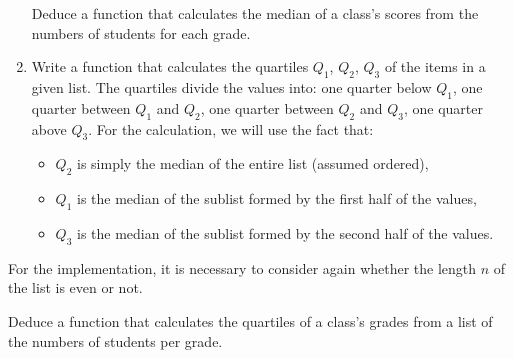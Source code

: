 \documentclass[11pt,class=report,crop=false]{standalone}
\begin{document}
\begin{activite}
\begin{enumerate}

       
    Deduce a function that calculates the median of a class's scores from the numbers of students for each grade.
    
    \item Write a function  that calculates the quartiles $Q_1$, $Q_2$, $Q_3$ of the items in a given list. The quartiles divide the values into: one quarter below $Q_1$, one quarter between $Q_1$ and $Q_2$, one quarter between $Q_2$ and $Q_3$, one quarter above $Q_3$.
    For the calculation, we will use the fact that:
    \begin{itemize}
      \item $Q_2$ is simply the median of the entire list (assumed ordered),
      \item $Q_1$ is the median of the sublist formed by the first half of the values,
      \item $Q_3$ is the median of the sublist formed by the second half of the values. 
    \end{itemize}           
\end{enumerate}

  For the implementation, it is necessary to consider again whether the length $n$ of the list is even or not.
  
  Deduce a function that calculates the quartiles of a class's grades from a list of the numbers of students per grade.

\end{activite}


\end{document}
